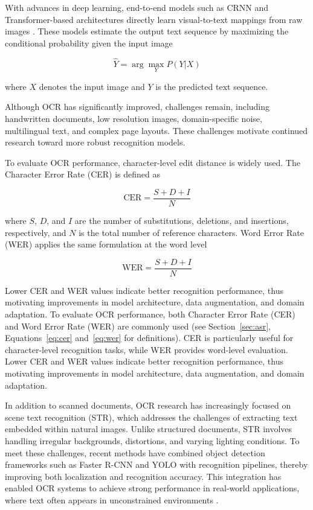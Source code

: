 With advances in deep learning, end-to-end models such as CRNN and Transformer-based architectures directly learn visual-to-text mappings from raw images \cite{shi2016crnn, baek2019whatiswrong, li2021trocr}. These models estimate the output text sequence by maximizing the conditional probability given the input image

\begin{equation*}
    \hat{Y} = \arg\max_{Y} P(Y|X)
\end{equation*}

where $X$ denotes the input image and $Y$ is the predicted text sequence.

Although OCR has significantly improved, challenges remain, including handwritten documents, low resolution images, domain-specific noise, multilingual text, and complex page layouts. These challenges motivate continued research toward more robust recognition models.

To evaluate OCR performance, character-level edit distance is widely used. The Character Error Rate (CER) is defined as

\begin{equation*}
    \text{CER} = \frac{S + D + I}{N}
\end{equation*}

where $S$, $D$, and $I$ are the number of substitutions, deletions, and insertions, respectively, and $N$ is the total number of reference characters. Word Error Rate (WER) applies the same formulation at the word level

\begin{equation*}
    \text{WER} = \frac{S + D + I}{N}
\end{equation*}

Lower CER and WER values indicate better recognition performance, thus motivating improvements in model architecture, data augmentation, and domain adaptation.
To evaluate OCR performance, both Character Error Rate (CER) and Word Error Rate (WER) are commonly used (see Section~\ref{sec:asr}, Equations~\ref{eq:cer} and~\ref{eq:wer} for definitions). CER is particularly useful for character-level recognition tasks, while WER provides word-level evaluation. Lower CER and WER values indicate better recognition performance, thus motivating improvements in model architecture, data augmentation, and domain adaptation.

In addition to scanned documents, OCR research has increasingly focused on scene text recognition (STR), which addresses the challenges of extracting text embedded within natural images. Unlike structured documents, STR involves handling irregular backgrounds, distortions, and varying lighting conditions. To meet these challenges, recent methods have combined object detection frameworks such as Faster R-CNN and YOLO with recognition pipelines, thereby improving both localization and recognition accuracy. This integration has enabled OCR systems to achieve strong performance in real-world applications, where text often appears in unconstrained environments \cite{baek2019whatiswrong}.

